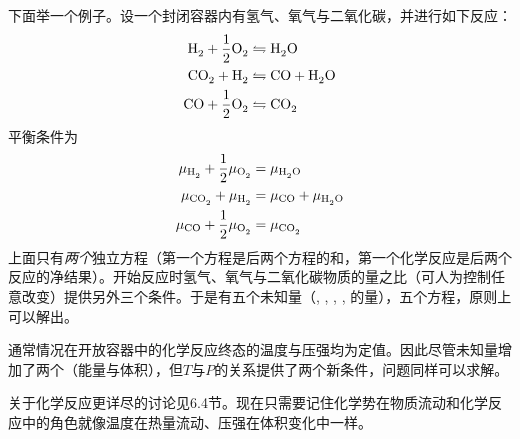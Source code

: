 下面举一个例子。设一个封闭容器内有氢气、氧气与二氧化碳，并进行如下反应：
\begin{equation}
\begin{split}
	\ce{H2} + \frac{1}{2} \ce{O2} &\leftrightharpoons \ce{H2O} \\
	\ce{CO2} + \ce{H2} &\leftrightharpoons \ce{CO} + \ce{H2O} \\
	\ce{CO} + \frac{1}{2} \ce{O2} &\leftrightharpoons \ce{CO2}
\end{split}
\label{equ2.71}
\end{equation}
平衡条件为
\begin{equation}
\begin{split}
	\mu_{\ce{H2}} + \frac{1}{2} \mu_{\ce{O2}} &= \mu_{\ce{H2O}} \\
	\mu_{\ce{CO2}} + \mu_{\ce{H2}} &= \mu_{\ce{CO}} + \mu_{\ce{H2O}} \\
	\mu_{\ce{CO}} + \frac{1}{2} \mu_{\ce{O2}} &= \mu_{\ce{CO2}}
\end{split}
\label{equ2.72}
\end{equation}
上面只有{\it 两个}独立方程（第一个方程是后两个方程的和，第一个化学反应是后两个反应的净结果）。开始反应时氢气、氧气与二氧化碳物质的量之比（可人为控制任意改变）提供另外三个条件。于是有五个未知量（, , , , 的量），五个方程，原则上可以解出。

通常情况在开放容器中的化学反应终态的温度与压强均为定值。因此尽管未知量增加了两个（能量与体积），但$T$与$P$的关系提供了两个新条件，问题同样可以求解。

关于化学反应更详尽的讨论见6.4节。现在只需要记住化学势在物质流动和化学反应中的角色就像温度在热量流动、压强在体积变化中一样。